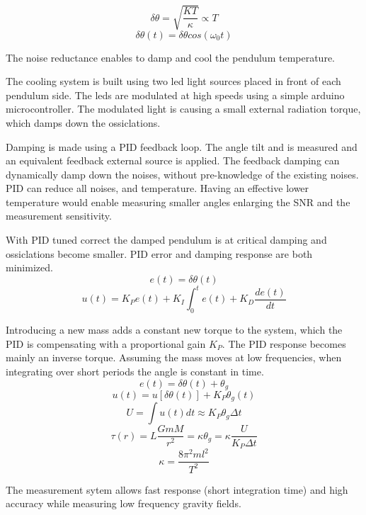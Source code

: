 \documentclass[\main/master.tex]{subfiles}
\begin{document}
\begin{equation}
\delta\theta = \sqrt{\frac{KT}{\kappa}}\propto{T}  \label{eqn:radiation force}
\end{equation}
\begin{equation}
\delta\theta(t) = \delta\theta cos(\omega_0 t)   \label{eqn:pid_error}
\end{equation}
\par\noindent
The noise reductance enables to damp and cool the pendulum temperature. 
\par\noindent
The cooling system is built using two led light sources placed in front of each pendulum side. The leds are modulated at high speeds using a simple arduino microcontroller. The modulated light is causing a small external radiation torque, which damps down the ossiclations.
\par\noindent
Damping is made using a PID feedback loop. The angle tilt and is measured and an equivalent feedback external source is applied. The feedback damping can dynamically damp down the noises, without pre-knowledge of the existing noises. PID can reduce all noises, and temperature. Having an effective lower temperature would enable measuring smaller angles enlarging the SNR and the measurement sensitivity.


\par\noindent
With PID tuned correct the damped pendulum is at critical damping and ossiclations become smaller. PID error and damping response are both minimized. 
\begin{equation}
e(t) = \delta\theta(t)   \label{eqn:pid_error}
\end{equation}
\begin{equation}
u(t) = K_Pe(t)+K_I\int_{0}^{t}e(t)+K_D\frac{de(t)}{dt}   \label{eqn:PID_eq}
\end{equation}

\noindent
Introducing a new mass adds a constant new torque to the system, which the PID is compensating with a proportional gain $K_P$. The PID response becomes mainly an inverse torque. Assuming the mass moves at low frequencies, when integrating over short periods the angle is constant in time.
\begin{equation}
e(t) = \delta\theta(t) + \theta_g    \label{eqn:PID_measurement}
\end{equation}
\begin{equation}
u(t) = u[ \delta\theta(t)] + K_P\theta_g(t) \label{eqn:PID_measurement_eq}
\end{equation}
\begin{equation}
U = \int u(t)dt  \approx K_P\theta_g\Delta t \label{eqn:PID_measurement_eq}
\end{equation}
\begin{equation}
\tau(r) = L\frac{GmM}{r^2} =  \kappa\theta_g = \kappa\frac{U}{K_P\Delta t}      \label{eqn:pid_gravitation_torque}
\end{equation}
\begin{equation}
\kappa =\frac{8\pi^2ml^2}{T^2}    \label{eqn:empirical_torque}
\end{equation}

\noindent
The measurement sytem allows fast response (short integration time) and high accuracy while measuring low frequency gravity fields. 

 
 
 
 
\end{document}
